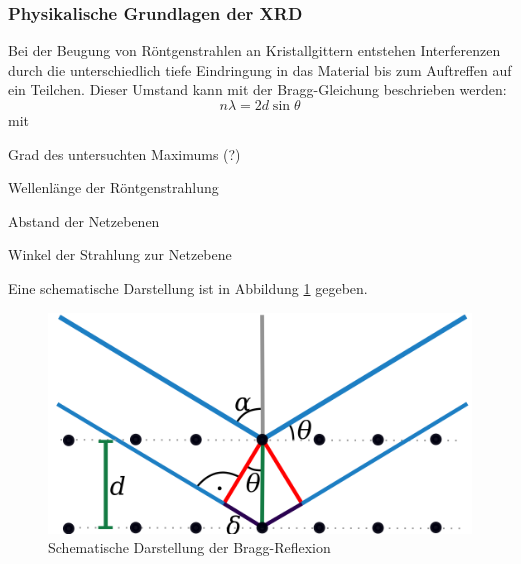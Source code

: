 \documentclass[a4paper, 11pt, headsepline,footsepline,twoside,abstract]{scrbook}
\begin{document}
\subsubsection{Physikalische Grundlagen der XRD}
Bei der Beugung von Röntgenstrahlen an Kristallgittern entstehen Interferenzen durch die unterschiedlich tiefe Eindringung in das Material bis zum Auftreffen auf ein Teilchen. Dieser Umstand kann mit der Bragg-Gleichung beschrieben werden:
\begin{equation}
n\lambda = 2d \sin{\theta}
\end{equation}
mit
\begin{description}\itemsep0pt
\item[n] Grad des untersuchten Maximums (?)
\item[$\lambda$] Wellenlänge der Röntgenstrahlung
\item[d] Abstand der Netzebenen
\item[$\theta$] Winkel der Strahlung zur Netzebene
\end{description}
Eine schematische Darstellung ist in Abbildung \ref{bragg} gegeben.
\begin{figure}
	\centering
	\includegraphics[width=0.6\columnwidth]{images/Bragg.png}
	\caption{Schematische Darstellung der Bragg-Reflexion \cite{wiki_bragg}}
	\label{bragg}
\end{figure}
\end{document}

